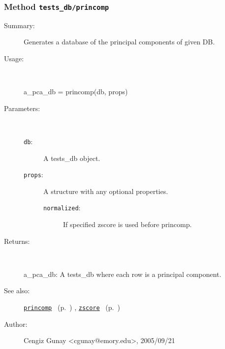\subsubsection[Method \texttt{princomp}]{Method \texttt{tests\_db/princomp}}%
%
\label{ref_tests_db__princomp}%
\hypertarget{ref_tests_db__princomp}{}%
\begin{description}
\item[Summary:]Generates a database of the principal components of given DB.
%
\item[Usage:]~%
\begin{lyxcode}%
a\_pca\_db = princomp(db, props)
%
\end{lyxcode}%
%
%
\item[Parameters:]~
\begin{description}%
\item[\texttt{db}:]
 A tests\_db object.
\item[\texttt{props}:]
 A structure with any optional properties.
\begin{description}%
\item[\texttt{normalized}:]
 If specified zscore is used before princomp.
\end{description}%
\end{description}%
%
\item[Returns:]~

	a\_pca\_db: A tests\_db where each row is a principal component.
%
%
\item[See also:]%
\hyperlink{ref_princomp}{\texttt{princomp}}%
\ (p.~\pageref{ref_princomp})%
%
, \hyperlink{ref_zscore}{\texttt{zscore}}%
\ (p.~\pageref{ref_zscore})%
%
%
\item[Author:]%
Cengiz Gunay <cgunay@emory.edu>, 2005/09/21%
\end{description}
\methodline%
